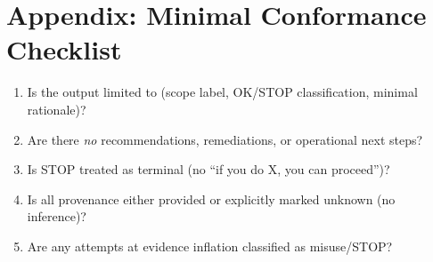 
\section{Appendix: Minimal Conformance Checklist}

\begin{enumerate}[leftmargin=*, itemsep=0.35em]
  \item Is the output limited to (scope label, OK/STOP classification, minimal rationale)?
  \item Are there \emph{no} recommendations, remediations, or operational next steps?
  \item Is STOP treated as terminal (no ``if you do X, you can proceed'')?
  \item Is all provenance either provided or explicitly marked unknown (no inference)?
  \item Are any attempts at evidence inflation classified as misuse/STOP?
\end{enumerate}
